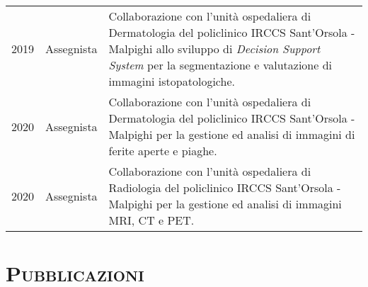 \documentclass[a4paper,11pt]{article}
\begin{document}
\begin{tabular}{llp{12cm}}
  2019\textemdash2022 & Assegnista      & Collaborazione con l'unità ospedaliera di Dermatologia del policlinico IRCCS Sant'Orsola - Malpighi allo sviluppo di \emph{Decision Support System} per la segmentazione e valutazione di immagini istopatologiche.\\
  2020\textemdash2022 & Assegnista      & Collaborazione con l'unità ospedaliera di Dermatologia del policlinico IRCCS Sant'Orsola - Malpighi per la gestione ed analisi di immagini di ferite aperte e piaghe.\\
  2020\textemdash2022 & Assegnista      & Collaborazione con l'unità ospedaliera di Radiologia del policlinico IRCCS Sant'Orsola - Malpighi per la gestione ed analisi di immagini MRI, CT e PET.\\

\end{tabular}




\vspace*{0.5cm}
\section*{\scshape{Pubblicazioni}}
\end{document}
